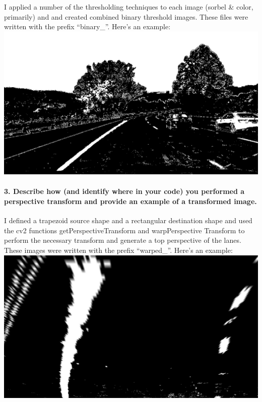 \documentclass[11pt]{article}
\makeatletter
\def\maxwidth{\ifdim\Gin@nat@width>\linewidth\linewidth
    \else\Gin@nat@width\fi}
\let\Oldincludegraphics\includegraphics
\renewcommand{\includegraphics}[1]{\Oldincludegraphics[width=.8\maxwidth]{#1}}
\makeatother
\begin{document}
I applied a number of the thresholding techniques to each image (sorbel
\& color, primarily) and and created combined binary threshold images.
These files were written with the prefix ``binary\_''. Here's an
example: \includegraphics{./output_images/binary_test1.jpg}

\hypertarget{describe-how-and-identify-where-in-your-code-you-performed-a-perspective-transform-and-provide-an-example-of-a-transformed-image.}{%
\paragraph{3. Describe how (and identify where in your code) you
performed a perspective transform and provide an example of a
transformed
image.}\label{describe-how-and-identify-where-in-your-code-you-performed-a-perspective-transform-and-provide-an-example-of-a-transformed-image.}}

I defined a trapezoid source shape and a rectangular destination shape
and used the cv2 functions getPerspectiveTransform and warpPerspective
Transform to perform the necessary transform and generate a top
perspective of the lanes. These images were written with the prefix
``warped\_''. Here's an example:
\includegraphics{./output_images/warped_test1.jpg}
\end{document}
